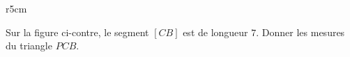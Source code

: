 
\begin{exercice}\label{exosmath-0443}

\begin{wrapfigure}{r}{5cm}
   \vspace{-2cm}        %
   \centering
   
\end{wrapfigure}

Sur la figure ci-contre, le segment \( [CB]\) est de longueur \( 7\). Donner les mesures du triangle \( PCB\).

\end{exercice}
